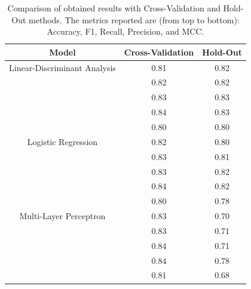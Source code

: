             \begin{table}[htbp]
                \centering
                \caption{Comparison of obtained results with Cross-Validation and Hold-Out methods. The metrics reported are (from top to bottom): Accuracy, F1, Recall, Precision, and MCC.}
                \label{tab:feature_engineering_approach_holdout}
                \begin{tabular}{|c|c|c|}
                \hline
                \textbf{Model} & \textbf{Cross-Validation} & \textbf{Hold-Out} \\ \hline
                    Linear-Discriminant Analysis    & 0.81 & 0.82 \\ 
                                                    & 0.82 & 0.82 \\ 
                                                    & 0.83 & 0.83 \\ 
                                                    & 0.84 & 0.83 \\
                                                    & 0.80 & 0.80 \\ 
                                                    \hline
                    Logistic Regression             & 0.82 & 0.80 \\ 
                                                    & 0.83 & 0.81 \\ 
                                                    & 0.83 & 0.82 \\ 
                                                    & 0.84 & 0.82 \\
                                                    & 0.80 & 0.78 \\
                                                    \hline
                    Multi-Layer Perceptron          & 0.83 & 0.70 \\ 
                                                    & 0.83 & 0.71 \\ 
                                                    & 0.84 & 0.71 \\
                                                    & 0.84 & 0.78 \\ 
                                                    & 0.81 & 0.68 \\ 
                                                    \hline
                \end{tabular}
            \end{table}

